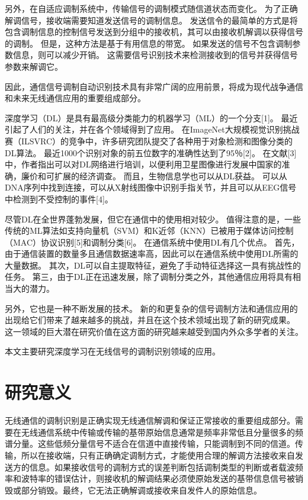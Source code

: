 另外，在自适应调制系统中，传输信号的调制模式随信道状态而变化。 为了正确解调信号，接收端需要知道发送信号的调制信息。 发送信令的最简单的方式是将包含调制信息的控制信号发送到分组中的接收机，其可以由接收机解调以获得信号的调制。 但是，这种方法是基于有用信息的带宽。 如果发送的信号不包含调制参数信息，则可以减少开销。 这需要信号识别技术来检测接收到的信号并获得信号参数来解调它。\par

因此，通信信号调制自动识别技术具有非常广阔的应用前景，将成为现代战争通信和未来无线通信应用的重要组成部分。\par

深度学习（DL）是具有最高级分类能力的机器学习（ML）的一个分支[1]。 最近引起了人们的关注，并在各个领域得到了应用。 在ImageNet大规模视觉识别挑战赛（ILSVRC）的竞争中，许多研究团队提交了各种用于对象检测和图像分类的DL算法。 最近1000个识别对象的前五位数字的准确性达到了95％[2]。 在文献[3]中，作者指出可以对DL网络进行培训，以便利用卫星图像进行发展中国家的准确，廉价和可扩展的经济调查。 而且，生物信息学也可以从DL获益。 可以从DNA序列中找到连接，可以从X射线图像中识别手指关节，并且可以从EEG信号中检测到不受控制的事件[4]。\par

尽管DL在全世界蓬勃发展，但它在通信中的使用相对较少。 值得注意的是，一些传统的ML算法如支持向量机（SVM）和K近邻（KNN）已被用于媒体访问控制（MAC）协议识别[5]和调制分类[6]。 在通信系统中使用DL有几个优点。 首先，由于通信装置的数量多且通信数据速率高，因此可以在通信系统中使用DL所需的大量数据。 其次，DL可以自主提取特征，避免了手动特征选择这一具有挑战性的任务。 第三，由于DL正在迅速发展，除了调制分类之外，其他通信应用将具有相当大的潜力。\par

另外，它也是一种不断发展的技术。 新的和更复杂的信号调制方法和通信应用的出现给它们带来了越来越多的挑战，并且在这个技术领域出现了新的研究成果。 这一领域的巨大潜在研究价值在这方面的研究越来越受到国内外众多学者的关注。\par

本文主要研究深度学习在无线信号的调制识别领域的应用。\par


\section{研究意义}

无线通信的调制识别是正确实现无线通信解调和保证正常接收的重要组成部分。需要在无线通信系统中传输或传输的基带原始信息通常是频率非常低且分量很多的频谱分量。这些低频分量信号不适合在信道中直接传输，只能调制到不同的信道。传输，所以在接收端，只有正确确定调制方式，才能使用合理的解调方法接收来自发送方的信息。如果接收信号的调制方式的误差判断包括调制类型的判断或者载波频率和波特率的错误估计，则接收机的解调结果必须使原始发送的基带信息信号被销毁或部分销毁。最终，它无法正确解调或接收来自发件人的原始信息。\par

